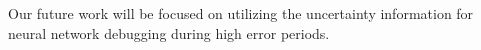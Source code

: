 \documentclass[conference,compsoc,final]{IEEEtran}
\begin{document}
Our future work will be focused on utilizing the uncertainty information for neural network debugging during high error periods. 










































\end{document}
